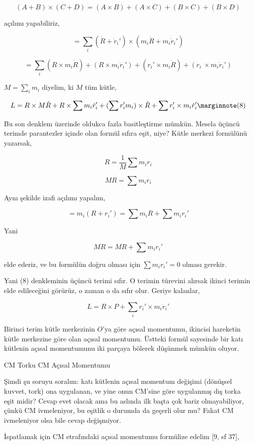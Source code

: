 \documentclass[12pt,fleqn]{article}\usepackage{../../common}
\begin{document}
$$
(A + B) \times (C+D) = (A \times B) + (A \times C) + (B \times C) + (B \times D) 
$$

açılımı yapabiliriz, 

$$
 = \sum_i (\dot{R} + \dot{r}_i') \times (m_i \dot{R} + m_i \dot{r}_i' )
$$


$$
= \sum_i (R \times m_i \dot{R}) +
  (R \times m_i \dot{r}_i') +
  (r_i' \times m_i \dot{R}) +
  (r_i\ \times m_i \dot{r}_i')   
$$

$M = \sum_i m_i $ diyelim, ki $M$ tüm kütle,

$$
L = R \times M\dot{R} +
R \times \sum m_i \dot{r}_i' +
(\sum r_i' m_i) \times \dot{R} +
\sum r_i' \times m_i \dot{r}_i'
\mlabel{8}
$$

Bu son denklem üzerinde oldukca fazla basitleştirme mümkün. Mesela üçüncü
terimde parantezler içinde olan formül sıfıra eşit, niye? Kütle merkezi
formülünü yazarsak,

$$
R = \frac{1}{M} \sum m_i r_i
$$

$$
MR = \sum m_i r_i
$$

Aynı şekilde izafi açılımı yapalım,

$$
= m_i (R + r_i') = \sum m_i R + \sum m_i r_i'
$$

Yani

$$
MR = MR + \sum m_i r_i'
$$

elde ederiz, ve bu formülün doğru olması için $\sum m_i r_i' = 0$ olması gerekir.

Yani (8) denkleminin üçüncü terimi sıfır. O terimin türevini alırsak
ikinci terimin elde edileceğini görürüz, o zaman o da sıfır olur. Geriye
kalanlar,

$$
L = R \times P + \sum_i r_i' \times m_i \dot{r}_i' 
$$

Birinci terim kütle merkezinin $O$'ya göre açısal momentumu, ikincisi hareketin
kütle merkezine göre olan açısal momentumu. Üstteki formül sayesinde bir
katı kütlenin açısal momentumunu iki parçaya bölerek düşünmek mümkün oluyor.

CM Torku CM Açısal Momentumu

Şimdi şu soruyu soralım: katı kütlenin açısal momentum değişimi (dönüşsel
kuvvet, tork) ona uygulanan, ve yine onun CM'sine göre uygulanmış dış torka eşit
midir? Cevap evet olacak ama bu aslında ilk başta çok bariz olmayabiliyor, çünkü
CM ivmeleniyor, bu eşitlik o durumda da geçerli olur mu? Fakat CM ivmeleniyor
olsa bile cevap değişmiyor.

İspatlamak için CM etrafındaki açısal momentumu formülize edelim [9, sf 37],
\end{document}
